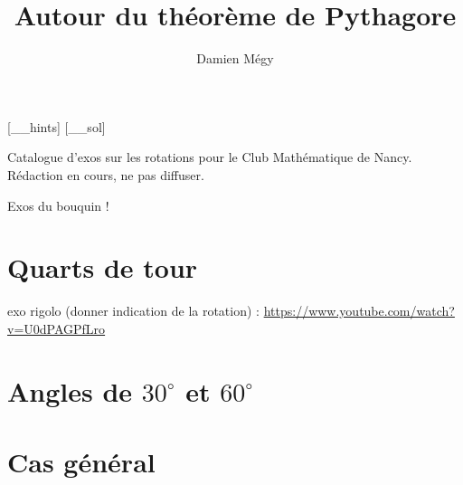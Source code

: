 





[_\jobname_hints]
[_\jobname_sol]


\title{Autour du théorème de Pythagore}
\author{Damien Mégy}
\maketitle

Catalogue d'exos sur les rotations pour le Club Mathématique de Nancy. Rédaction en cours, ne pas diffuser.

Exos du bouquin !


\section{Quarts de tour}

exo rigolo (donner indication de la rotation) : \url{https://www.youtube.com/watch?v=U0dPAGPfLro}

\section{Angles de $30^\circ$ et $60^\circ$}

\section{Cas général}


\indications
\correction



